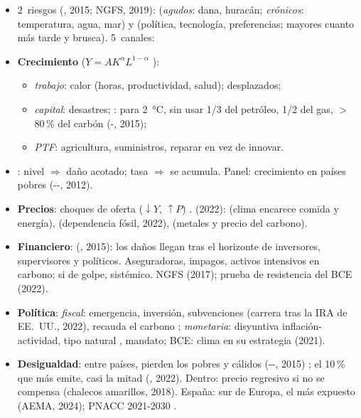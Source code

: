 \documentclass{article}
\begin{document}
\begin{columnas}
\begin{itemize}
\item 2~riesgos (, 2015; NGFS, 2019):  (\emph{agudos}: dana, huracán; \emph{crónicos}: temperatura, agua, mar) y  (política, tecnología, preferencias; mayores cuanto más tarde y brusca). 5~canales:
\item \textbf{Crecimiento} ($Y=AK^\alpha L^{1-\alpha}$ ):
  \begin{itemize}
  \item \emph{trabajo}: calor (horas, productividad, salud); desplazados;
  \item \emph{capital}: desastres; : para 2~°C, sin usar 1/3 del petróleo, 1/2 del gas, $>$80\,\% del carbón (-, 2015);
  \item \emph{PTF}: agricultura, suministros, reparar en vez de innovar.
  \end{itemize}
\item {}: nivel $\Rightarrow$ daño acotado; tasa $\Rightarrow$ se acumula. Panel: crecimiento en países pobres (--, 2012).
\item \textbf{Precios}: choques de oferta ($\downarrow Y$, $\uparrow P$) .  (2022):  (clima encarece comida y energía),  (dependencia fósil, 2022),  (metales y precio del carbono).
\item \textbf{Financiero}:  (, 2015): los daños llegan tras el horizonte de inversores, supervisores y políticos. Aseguradoras, impagos, activos intensivos en carbono; si de golpe, sistémico. NGFS (2017); prueba de resistencia del BCE (2022).
\item \textbf{Política}: \emph{fiscal}: emergencia, inversión, subvenciones (carrera tras la IRA de EE.~UU., 2022), recauda el carbono ; \emph{monetaria}: disyuntiva inflación-actividad, tipo natural , mandato; BCE: clima en su estrategia (2021).
\item \textbf{Desigualdad}: entre países, pierden los pobres y cálidos (--, 2015) ; el 10\,\% que más emite, casi la mitad (, 2022). Dentro: precio regresivo si no se compensa (chalecos amarillos, 2018). España: sur de Europa, el más expuesto (AEMA, 2024); PNACC 2021-2030 .
\end{itemize}


\end{columnas}
\end{document}
